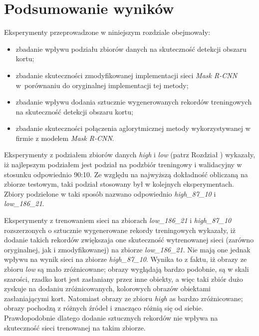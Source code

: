 \section{Podsumowanie wyników}

Eksperymenty przeprowadzone w niniejszym rozdziale obejmowały:
\begin{itemize}
 \item zbadanie wpływu podziału zbiorów danych na skuteczność detekcji obszaru kortu;
 \item zbadanie skuteczności zmodyfikowanej implementacji sieci \textit{Mask R-CNN} w~porównaniu do oryginalnej implementacji tej metody;
 \item zbadanie wpływu dodania sztucznie wygenerowanych rekordów treningowych na skuteczność detekcji obszaru kortu;
 \item zbadanie skuteczności połączenia aglorytmicznej metody wykorzystywanej w firmie \blue{} z modelem \textit{Mask R-CNN}.
\end{itemize}

Eksperymenty z podziałem zbiorów danych \textit{high} i \textit{low} (patrz Rozdział ) wykazały, iż najlepszym podziałem jest podział na podzbiór treningowy i walidacyjny w stosunku odpowiednio 90:10. Ze względu na najwyższą dokładność obliczaną na zbiorze testowym, taki podział stosowany był w kolejnych eksperymentach. Zbiory podzielone w taki sposób nazwano odpowiednio \textit{high\_87\_10} i \textit{low\_186\_21}.




Eksperymenty z trenowaniem sieci na zbiorach \textit{low\_186\_21} i \textit{high\_87\_10} rozszerzonych o sztucznie wygenerowane rekordy treningowych wykazały, iż dodanie takich rekordów zwiększaja one skuteczność wytrenowanej sieci (zarówno oryginalnej, jak i zmodyfikowanej) na zbiorze \textit{low\_186\_21}. Nie mają one jednak wpływu na wynik sieci na zbiorze \textit{high\_87\_10}. Wynika to z faktu, iż obrazy ze zbioru \textit{low} są mało zróżnicowane; obrazy wyglądają bardzo podobnie, są w skali szarości, rzadko kort jest zasłaniany przez inne obiekty, a więc taki zbiór dużo zyskuje na dodaniu zróżnicowanych, kolorowych obrazów obiektami zasłaniającymi kort. Natomiast obrazy ze zbioru \textit{high} as bardzo zróżnicowane; obrazy pochodzą z różnych źródeł i znacząco różnią się od siebie. Prawdopodobnie dlatego dodanie sztucznych rekordów nie wpływa na skuteczność sieci trenowanej na takim zbiorze.


